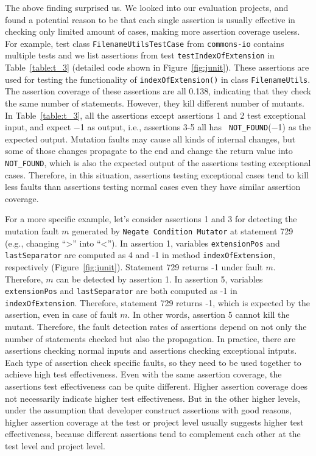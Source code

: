 The above finding surprised us. We looked into our evaluation
projects, and found a potential reason to be that each single
assertion is usually effective in checking only limited amount of
cases, making more assertion coverage useless. For example, test class
{\tt {}FilenameUtilsTestCase} from {\tt commons-io}
contains multiple tests and we list assertions from test
{\tt testIndexOfExtension} in Table~\ref{table:t_3} (detailed
code shown in Figure~\ref{fig:junit}). These assertions are used for
testing the functionality of {\tt indexOfExtension()} in class {\tt FilenameUtils}.
The assertion coverage of these assertions are all 0.138, indicating
that they check the same number of statements. However, they kill
different number of mutants. In Table~\ref{table:t_3}, all the
assertions except assertions 1 and 2 test exceptional input, and
expect $-$1 as output, i.e., assertions 3-5 all has {\tt
NOT\_FOUND}($-$1) as the expected output. Mutation faults may cause
all kinds of internal changes, but some of those changes propagate to
the end and change the return value into {\tt NOT\_FOUND}, which is
also the expected output of the assertions testing exceptional cases.
Therefore, in this situation, assertions testing exceptional cases
tend to kill less faults than assertions testing normal cases even they have
similar assertion coverage. 

For a more specific example, let's consider assertions 1 and 3 for
detecting the mutation fault $m$ generated by {\tt Negate Condition
Mutator} at statement 729 (e.g., changing ``>'' into ``<'').  In
assertion 1, variables {\tt extensionPos} and {\tt lastSeparator} are
computed as 4 and -1 in method {\tt indexOfExtension}, respectively
(Figure~\ref{fig:junit}). Statement 729 returns -1 under fault
$m$. Therefore, $m$ can be detected by assertion 1.  In assertion 5,
variables {\tt extensionPos} and {\tt lastSeparator} are both computed
as -1 in {\tt indexOfExtension}. Therefore, statement 729 returns -1,
which is expected by the assertion, even in case of fault $m$. In
other words, assertion 5 cannot kill the mutant.  Therefore, the fault
detection rates of assertions depend on not only the number of
statements checked but also the propagation.  In practice, there are
assertions checking normal inputs and assertions checking exceptional
intputs. Each type of assertion check specific faults, so they need
to be used together to achieve high test effectiveness. Even with the
same assertion coverage, the assertions test effectiveness can be
quite different. Higher assertion coverage does not necessarily
indicate higher test effectiveness. But in the other higher levels,
under the assumption that developer construct assertions with good
reasons, higher assertion coverage at the test or project level
usually suggests higher test effectiveness, because different
assertions tend to complement each other at the test level and project
level.



